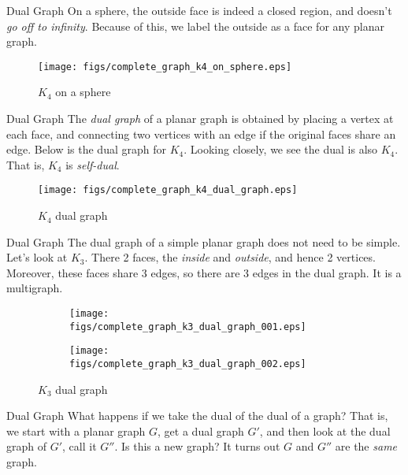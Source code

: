 \documentclass{beamer}
\begin{document}
    \begin{frame}{Dual Graph}
        On a sphere, the outside face is indeed a closed region, and doesn't
        \textit{go off to infinity}. Because of this, we label the outside as a
        face for any planar graph.
        \begin{figure}
            \centering
            \texttt{[image: figs/complete\_graph\_k4\_on\_sphere.eps]}
            \caption{$K_{4}$ on a sphere}
            \label{fig:k4_on_sphere}
        \end{figure}
    \end{frame}
    \begin{frame}{Dual Graph}
        The \textit{dual graph} of a planar graph is obtained by placing
        a vertex at each face, and connecting two vertices with an edge if
        the original faces share an edge. Below is the dual graph for $K_{4}$.
        Looking closely, we see the dual is also $K_{4}$. That is,
        $K_{4}$ is \textit{self-dual}.
        \begin{figure}
            \centering
            \texttt{[image: figs/complete\_graph\_k4\_dual\_graph.eps]}
            \caption{$K_{4}$ dual graph}
            \label{fig:k4_dual}
        \end{figure}
    \end{frame}
    \begin{frame}{Dual Graph}
        The dual graph of a simple planar graph does not need to be simple.
        Let's look at $K_{3}$. There 2 faces, the \textit{inside} and
        \textit{outside}, and hence 2 vertices. Moreover, these faces
        share 3 edges, so there are 3 edges in the dual graph. It is a
        multigraph.
        \begin{figure}
            \centering
            \begin{subfigure}[b]{0.49\textwidth}
                \centering
                \texttt{[image: figs/complete\_graph\_k3\_dual\_graph\_001.eps]}
            \end{subfigure}
            \begin{subfigure}[b]{0.49\textwidth}
                \centering
                \texttt{[image: figs/complete\_graph\_k3\_dual\_graph\_002.eps]}
            \end{subfigure}
            \caption{$K_{3}$ dual graph}
            \label{fig:k3_dual}
        \end{figure}
    \end{frame}
    \begin{frame}{Dual Graph}
        What happens if we take the dual of the dual of a graph? That is,
        we start with a planar graph $G$, get a dual graph $G'$, and then look
        at the dual graph of $G'$, call it $G''$. Is this a new graph? It turns
        out $G$ and $G''$ are the \textit{same} graph.
    \end{frame}
\end{document}
